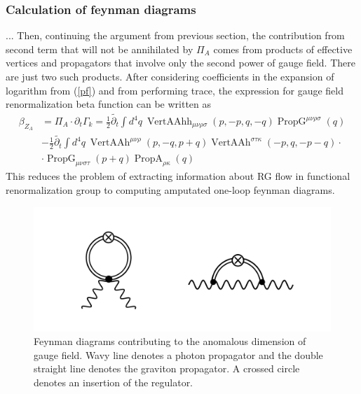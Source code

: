 \documentclass[11pt, a4paper]{article}
\begin{document}
\subsubsection{Calculation of feynman diagrams}
... Then, continuing the argument from previous section, the contribution from second term that will not be annihilated
by $\varPi_A$ comes from products of effective vertices and propagators that involve only the second power of gauge field.
There are just two such products. After considering coefficients in the expansion of logarithm from (\ref{pf}) and from performing trace, the expression for gauge field renormalization beta function can be written as
\begin{align}
    \beta_{Z_A} & = \varPi_A \cdot \partial_t \Gamma_k = \frac{1}{2} \widetilde{\partial_t} \int d^4 q \ \operatorname{VertAAhh}_{\mu\nu\rho\sigma}(p,-p,q,-q) \operatorname{PropG}^{\mu\nu\rho\sigma}(q)\\
    & - \frac{1}{2} \widetilde{\partial_t} \int d^4 q \ \operatorname{VertAAh}^{\mu\nu\rho}(p,-q,p+q) \operatorname{VertAAh}^{\sigma\tau\kappa}(-p,q,-p-q) \cdot \\
    & \cdot \operatorname{PropG}_{\mu\nu\sigma\tau}(p+q) \operatorname{PropA}_{\rho\kappa}(q)
\end{align}
This reduces the problem of extracting information about RG flow in functional renormalization group to computing amputated one-loop feynman diagrams.
\begin{figure}[H]
    \includegraphics[width=1\textwidth]{./figures/diags.png}
    \caption{Feynman diagrams contributing to the anomalous dimension of gauge field. Wavy line denotes a photon propagator
    and the double straight line denotes the graviton propagator. A crossed circle denotes an insertion of the regulator.}
    \label{diags}
\end{figure} 

\end{document}
